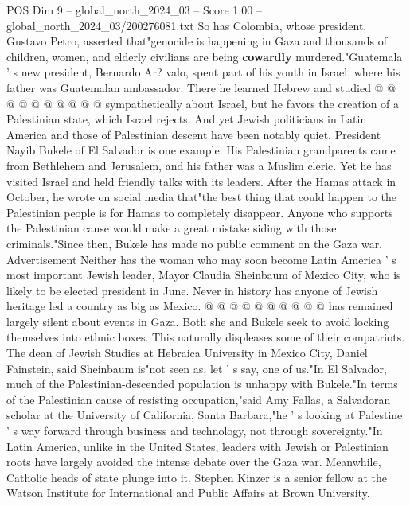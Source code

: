 \begin{textsample}{POS Dim 9 – global\_north\_2024\_03 – Score 1.00 – global\_north\_2024\_03/200276081.txt}
So has Colombia, whose president, Gustavo Petro, asserted that"genocide is happening in Gaza and thousands of children, women, and elderly civilians are being \textbf{cowardly} murdered."Guatemala ' s new president, Bernardo Ar? valo, spent part of his youth in Israel, where his father was Guatemalan ambassador.
There he learned Hebrew and studied @ @ @ @ @ @ @ @ @ @ sympathetically about Israel, but he favors the creation of a Palestinian state, which Israel rejects.
And yet Jewish politicians in Latin America and those of Palestinian descent have been notably quiet.
President Nayib Bukele of El Salvador is one example.
His Palestinian grandparents came from Bethlehem and Jerusalem, and his father was a Muslim cleric.
Yet he has visited Israel and held friendly talks with its leaders.
After the Hamas attack in October, he wrote on social media that"the best thing that could happen to the Palestinian people is for Hamas to completely disappear.
Anyone who supports the Palestinian cause would make a great mistake siding with those criminals."Since then, Bukele has made no public comment on the Gaza war.
Advertisement Neither has the woman who may soon become Latin America ' s most important Jewish leader, Mayor Claudia Sheinbaum of Mexico City, who is likely to be elected president in June.
Never in history has anyone of Jewish heritage led a country as big as Mexico. @ @ @ @ @ @ @ @ @ @ has remained largely silent about events in Gaza.
Both she and Bukele seek to avoid locking themselves into ethnic boxes.
This naturally displeases some of their compatriots.
The dean of Jewish Studies at Hebraica University in Mexico City, Daniel Fainstein, said Sheinbaum is"not seen as, let ' s say, one of us."In El Salvador, much of the Palestinian-descended population is unhappy with Bukele."In terms of the Palestinian cause of resisting occupation,"said Amy Fallas, a Salvadoran scholar at the University of California, Santa Barbara,"he ' s looking at Palestine ' s way forward through business and technology, not through sovereignty."In Latin America, unlike in the United States, leaders with Jewish or Palestinian roots have largely avoided the intense debate over the Gaza war.
Meanwhile, Catholic heads of state plunge into it.
Stephen Kinzer is a senior fellow at the Watson Institute for International and Public Affairs at Brown University.

\end{textsample}
